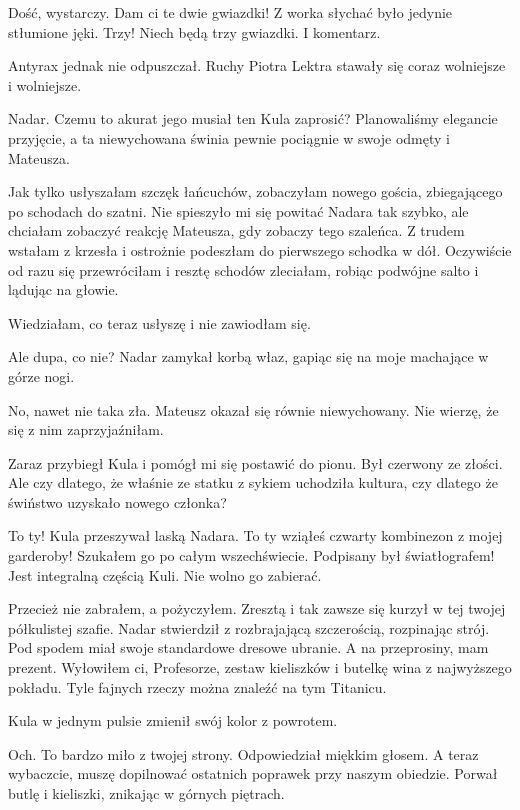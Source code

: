 \ds{} Dość, wystarczy. Dam ci te dwie gwiazdki! \dm{} Z worka słychać było jedynie stłumione jęki. \dm{} Trzy! Niech będą trzy gwiazdki. I komentarz. \de{}

Antyrax jednak nie odpuszczał. Ruchy Piotra Lektra stawały się coraz wolniejsze i wolniejsze.

\divider{}

Nadar. Czemu to akurat jego musiał ten Kula zaprosić?
Planowaliśmy elegancie przyjęcie, a ta niewychowana świnia pewnie pociągnie w swoje odmęty i Mateusza.

Jak tylko usłyszałam szczęk łańcuchów, zobaczyłam nowego gościa, zbiegającego po schodach do szatni.
Nie spieszyło mi się powitać Nadara tak szybko, ale chciałam zobaczyć reakcję Mateusza, gdy zobaczy tego szaleńca.
Z trudem wstałam z krzesła i ostrożnie podeszłam do pierwszego schodka w dół.
Oczywiście od razu się przewróciłam i resztę schodów zleciałam, robiąc podwójne salto i lądując na głowie.

Wiedziałam, co teraz usłyszę i nie zawiodłam się.

\ds{} Ale dupa, co nie? \dm{} Nadar zamykał korbą właz, gapiąc się na moje machające w górze nogi. \de{}

\ds{} No, nawet nie taka zła. \dm{} Mateusz okazał się równie niewychowany. Nie wierzę, że się z nim zaprzyjaźniłam. \de{}

Zaraz przybiegł Kula i pomógł mi się postawić do pionu. Był czerwony ze złości.
Ale czy dlatego, że właśnie ze statku z sykiem uchodziła kultura, czy dlatego że świństwo uzyskało nowego członka?

\ds{} To ty! \dm{} Kula przeszywał laską Nadara. \dm{} To ty wziąłeś czwarty kombinezon z mojej garderoby! Szukałem go po całym wszechświecie.
Podpisany był światłografem! Jest integralną częścią Kuli. Nie wolno go zabierać. \de{}

\ds{} Przecież nie zabrałem, a pożyczyłem. Zresztą i tak zawsze się kurzył w tej twojej półkulistej szafie. \dm{}
Nadar stwierdził z rozbrajającą szczerością, rozpinając strój. Pod spodem miał swoje standardowe dresowe ubranie. \dm{} 
A na przeprosiny, mam prezent. Wyłowiłem ci, Profesorze, zestaw kieliszków i butelkę wina z najwyższego pokładu. 
Tyle fajnych rzeczy można znaleźć na tym Titanicu. \de{}

Kula w jednym pulsie zmienił swój kolor z powrotem. 

\ds{} Och. To bardzo miło z twojej strony. \dm{} Odpowiedział miękkim głosem. \dm{} A teraz wybaczcie, muszę dopilnować ostatnich poprawek przy naszym obiedzie. \dm{}
Porwał butlę i kieliszki, znikając w górnych piętrach.

